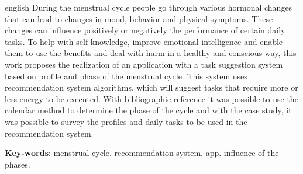 \begin{resumo}[Abstract]
 \begin{otherlanguage*}{english}
  During the menstrual cycle people go through various hormonal changes that can lead to
changes in mood, behavior and physical symptoms. These changes can influence
positively or negatively the performance of certain daily tasks. To help with self-knowledge, improve emotional intelligence and enable them to use the benefits and deal with
harm in a healthy and conscious way, this work proposes the realization of an application with a task suggestion system based on
profile and phase of the menstrual cycle. This system uses recommendation system algorithms, which will suggest tasks
that require more or less energy to be executed. With bibliographic reference
it was possible to use the calendar method to determine the phase of the cycle and with the
case study, it was possible to survey the profiles and daily tasks to be used in the
recommendation system.

   \vspace{\onelineskip}
 
   \noindent 
   \textbf{Key-words}: 
   menstrual cycle. recommendation system. app. influence of the phases.
 \end{otherlanguage*}
\end{resumo}
